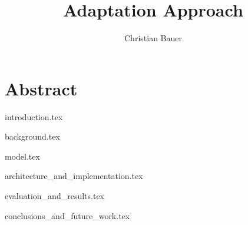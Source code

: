 \documentclass{memoir}
\title{Adaptation Approach}
\author{Christian Bauer}
\begin{document}
  \maketitle

  \tableofcontents
  \listoffigures
  

  \section*{Abstract}   

  {introduction.tex}

  {background.tex}


  {model.tex}

  {architecture_and_implementation.tex}
  
  {evaluation_and_results.tex}

  {conclusions_and_future_work.tex}


  
  
\end{document}
